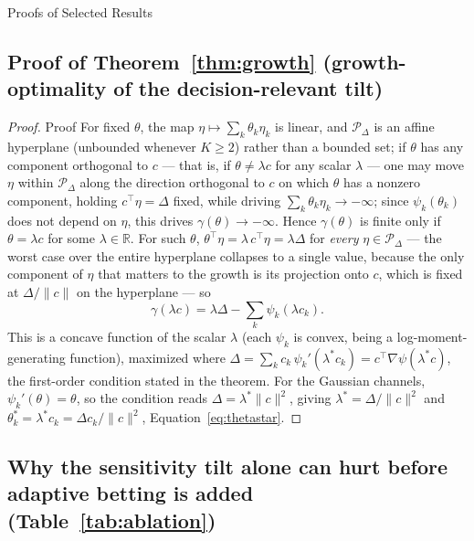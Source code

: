 \documentclass[trsc,dblanonrev]{informs4}
\begin{document}
\begin{APPENDIX}{Proofs of Selected Results}
\subsection{Proof of Theorem~\ref{thm:growth} (growth-optimality of the decision-relevant tilt)}

\begin{proof}{Proof}
For fixed $\theta$, the map $\eta \mapsto \sum_k \theta_k \eta_k$ is
linear, and $\mathcal P_\Delta$ is an affine hyperplane (unbounded
whenever $K \ge 2$) rather than a bounded set; if $\theta$ has any
component orthogonal to $c$ --- that is, if $\theta \ne \lambda c$ for
any scalar $\lambda$ --- one may move $\eta$ within $\mathcal P_\Delta$
along the direction orthogonal to $c$ on which $\theta$ has a nonzero
component, holding $c^\top\eta = \Delta$ fixed, while driving $\sum_k
\theta_k \eta_k \to -\infty$; since $\psi_k(\theta_k)$ does not depend
on $\eta$, this drives $\gamma(\theta) \to -\infty$. Hence $\gamma(\theta)$
is finite only if $\theta = \lambda c$ for some $\lambda \in \mathbb
R$. For such $\theta$, $\theta^\top \eta = \lambda\, c^\top \eta =
\lambda \Delta$ for \emph{every} $\eta \in \mathcal P_\Delta$ --- the
worst case over the entire hyperplane collapses to a single value,
because the only component of $\eta$ that matters to the growth is its
projection onto $c$, which is fixed at $\Delta/\lVert c\rVert$ on the
hyperplane --- so
\[
\gamma(\lambda c) = \lambda \Delta - \sum_k \psi_k(\lambda c_k).
\]
This is a concave function of the scalar $\lambda$ (each $\psi_k$ is
convex, being a log-moment-generating function), maximized where
$\Delta = \sum_k c_k\, \psi_k'(\lambda^\ast c_k) = c^\top
\nabla\psi(\lambda^\ast c)$, the first-order condition stated in the
theorem. For the Gaussian channels, $\psi_k'(\theta) = \theta$, so the
condition reads $\Delta = \lambda^\ast \lVert c \rVert^2$, giving
$\lambda^\ast = \Delta/\lVert c\rVert^2$ and $\theta_k^\ast = \lambda^\ast
c_k = \Delta c_k /\lVert c\rVert^2$, Equation~\eqref{eq:thetastar}.
\Halmos
\end{proof}

\subsection{Why the sensitivity tilt alone can hurt before adaptive betting is added (Table~\ref{tab:ablation})}


\end{APPENDIX}
\end{document}

